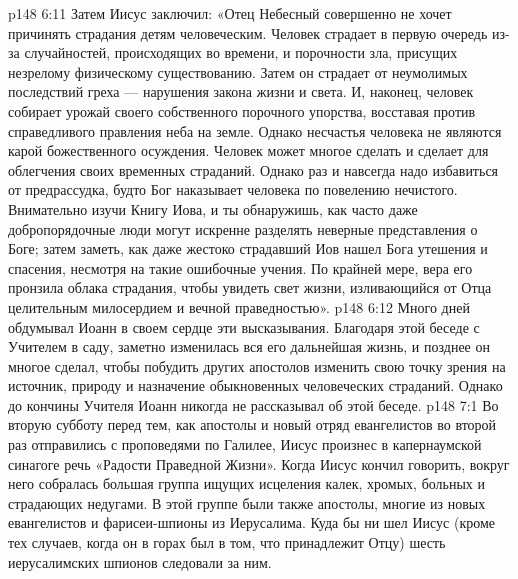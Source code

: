 \vs p148 6:11 Затем Иисус заключил: «Отец Небесный совершенно не хочет причинять страдания детям человеческим. Человек страдает в первую очередь из\hyp{}за случайностей, происходящих во времени, и порочности зла, присущих незрелому физическому существованию. Затем он страдает от неумолимых последствий греха --- нарушения закона жизни и света. И, наконец, человек собирает урожай своего собственного порочного упорства, восставая против справедливого правления неба на земле. Однако несчастья человека не являются  карой божественного осуждения. Человек может многое сделать и сделает для облегчения своих временных страданий. Однако раз и навсегда надо избавиться от предрассудка, будто Бог наказывает человека по повелению нечистого. Внимательно изучи Книгу Иова, и ты обнаружишь, как часто даже добропорядочные люди могут искренне разделять неверные представления о Боге; затем заметь, как даже жестоко страдавший Иов нашел Бога утешения и спасения, несмотря на такие ошибочные учения. По крайней мере, вера его пронзила облака страдания, чтобы увидеть свет жизни, изливающийся от Отца целительным милосердием и вечной праведностью».
\vs p148 6:12 Много дней обдумывал Иоанн в своем сердце эти высказывания. Благодаря этой беседе с Учителем в саду, заметно изменилась вся его дальнейшая жизнь, и позднее он многое сделал, чтобы побудить других апостолов изменить свою точку зрения на источник, природу и назначение обыкновенных человеческих страданий. Однако до кончины Учителя Иоанн никогда не рассказывал об этой беседе.
\vs p148 7:1 Во вторую субботу перед тем, как апостолы и новый отряд евангелистов во второй раз отправились с проповедями по Галилее, Иисус произнес в капернаумской синагоге речь «Радости Праведной Жизни». Когда Иисус кончил говорить, вокруг него собралась большая группа ищущих исцеления калек, хромых, больных и страдающих недугами. В этой группе были также апостолы, многие из новых евангелистов и фарисеи\hyp{}шпионы из Иерусалима. Куда бы ни шел Иисус (кроме тех случаев, когда он в горах был в том, что принадлежит Отцу) шесть иерусалимских шпионов следовали за ним.
